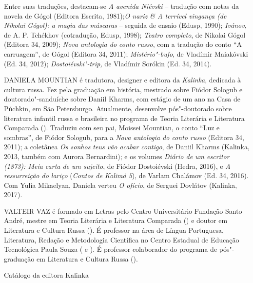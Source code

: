 Entre suas traduções, destacam-se \emph{A avenida Niévski} -- tradução
com notas da novela de Gógol (Editora Escrita, 1981);\emph{O nariz \& A
terrível vingança (de Nikolai Gógol): a magia das máscaras} -- seguida
de ensaio (Edusp, 1990); \emph{Ivánov}, de A. P. Tchékhov (cotradução,
Edusp, 1998); \emph{Teatro completo}, de Nikolai Gógol (Editora 34,
2009); \emph{Nova antologia do conto russo}, com a tradução do conto ``A
carruagem'', de Gógol (Editora 34, 2011); \emph{Mistério"-bufo}, de
Vladímir Maiakóvski (Ed. 34, 2012); \emph{Dostoiévski"-trip,} de Vladímir
Sorókin (Ed. 34, 2014).

\medskip

\noindent{}DANIELA MOUNTIAN é tradutora, designer e editora da \emph{Kalinka},
dedicada à cultura russa. Fez pela \scalebox{0.8}{USP} graduação em história, mestrado
sobre Fiódor Sologub e doutorado"-sanduíche sobre Daniil Kharms, com
estágio de um ano na Casa de Púchkin, em São Petersburgo. Atualmente,
desenvolve pós"-doutorado sobre literatura infantil russa e brasileira no
programa de Teoria Literária e Literatura Comparada (\scalebox{0.8}{USP}). Traduziu com
seu pai, Moissei Mountian, o conto ``Luz e sombras'', de Fiódor Sologub,
para a \emph{Nova antologia do conto russo} (Editora 34, 2011); a
coletânea \emph{Os sonhos teus vão acabar contigo}, de Daniil Kharms
(Kalinka, 2013, também com Aurora Bernardini); e os volumes \emph{Diário
de um escritor (1873): Meia carta de um sujeito}, de Fiódor Dostoiévski
(Hedra, 2016), e \emph{A ressurreição do lariço} (\emph{Contos de Kolimá
5}), de Varlam Chalámov (Ed. 34, 2016). Com Yulia Mikaelyan, Daniela
verteu \emph{O ofício}, de Serguei Dovlátov (Kalinka, 2017).

\medskip

\noindent{}VALTEIR VAZ é formado em Letras pelo Centro Universitário Fundação Santo
André, mestre em Teoria Literária e Literatura Comparada (\scalebox{0.8}{USP}) e doutor
em Literatura e Cultura Russa (\scalebox{0.8}{USP}). É professor na área de Língua
Portuguesa, Literatura, Redação e Metodologia Científica no Centro
Estadual de Educação Tecnológica Paula Souza (\scalebox{0.8}{ETEC} e \scalebox{0.8}{FATEC}). É professor
colaborador do programa de pós"-graduação em Literatura e Cultura Russa
(\scalebox{0.8}{LETRA/USP}).

\afterpage{\blankpage}

\newpage
\pagestyle{empty}
\MyriadPro

\noindent{}Catálogo da editora Kalinka\\[5pt]

